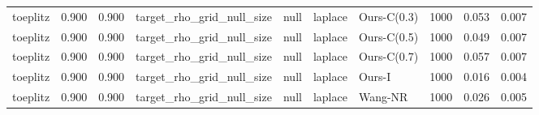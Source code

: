 \begin{tabular}{lrrllllrrr}
toeplitz & 0.900 & 0.900 & target\_rho\_grid\_null\_size & null & laplace & Ours-C(0.3) & 1000 & 0.053 & 0.007 \\
toeplitz & 0.900 & 0.900 & target\_rho\_grid\_null\_size & null & laplace & Ours-C(0.5) & 1000 & 0.049 & 0.007 \\
toeplitz & 0.900 & 0.900 & target\_rho\_grid\_null\_size & null & laplace & Ours-C(0.7) & 1000 & 0.057 & 0.007 \\
toeplitz & 0.900 & 0.900 & target\_rho\_grid\_null\_size & null & laplace & Ours-I & 1000 & 0.016 & 0.004 \\
toeplitz & 0.900 & 0.900 & target\_rho\_grid\_null\_size & null & laplace & Wang-NR & 1000 & 0.026 & 0.005 \\
\bottomrule
\end{tabular}
